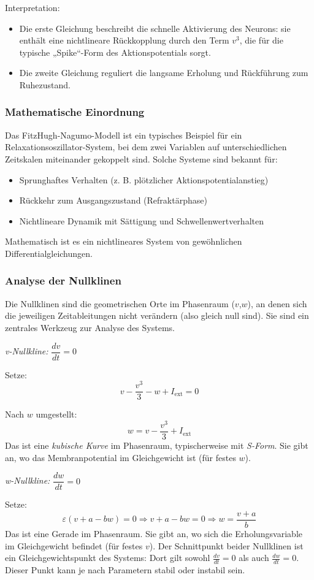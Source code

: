 \begin{refsection}
Interpretation:
\begin{itemize}
\item Die erste Gleichung beschreibt die schnelle Aktivierung des Neurons: sie enthält eine nichtlineare Rückkopplung durch den Term $v^3$, die für die typische „Spike“-Form des Aktionspotentials sorgt.
\item Die zweite Gleichung reguliert die langsame Erholung und Rückführung zum Ruhezustand.
\end{itemize}
\subsubsection{Mathematische Einordnung}
Das FitzHugh-Nagumo-Modell ist ein typisches Beispiel für ein Relaxationsoszillator-System, bei dem zwei Variablen auf unterschiedlichen Zeitskalen miteinander gekoppelt sind. Solche Systeme sind bekannt für:
\begin{itemize}
	\item Sprunghaftes Verhalten (z. B. plötzlicher Aktionspotentialanstieg)
	\item Rückkehr zum Ausgangszustand (Refraktärphase)
	\item Nichtlineare Dynamik mit Sättigung und Schwellenwertverhalten
\end{itemize}
Mathematisch ist es ein nichtlineares System von gewöhnlichen Differentialgleichungen.
\subsubsection{Analyse der Nullklinen}
Die Nullklinen sind die geometrischen Orte im Phasenraum ($v$,$w$), an denen sich die jeweiligen Zeitableitungen nicht verändern (also gleich null sind). Sie sind ein zentrales Werkzeug zur Analyse des Systems.

\emph{v-Nullkline:} $\dfrac{dv}{dt} = 0$

Setze:
\[
v - \frac{v^3}{3} - w + I_{\text{ext}} = 0
\]

Nach $w$ umgestellt:
\[
w = v - \frac{v^3}{3} + I_{\text{ext}}
\]
\noindent
Das ist eine \emph{kubische Kurve} im Phasenraum, typischerweise mit \emph{S-Form}.  
Sie gibt an, wo das Membranpotential im Gleichgewicht ist (für festes $w$).

\vspace{1em}

\emph{w-Nullkline:} $\dfrac{dw}{dt} = 0$

Setze:
\[
\varepsilon (v + a - b w) = 0 \Rightarrow v + a - b w = 0 \Rightarrow w = \frac{v + a}{b}
\]
\noindent
Das ist eine Gerade im Phasenraum.  
Sie gibt an, wo sich die Erholungsvariable im Gleichgewicht befindet (für festes $v$).
Der Schnittpunkt beider Nullklinen ist ein Gleichgewichtspunkt des Systems: Dort gilt sowohl $\frac{dv}{dt} = 0$ als auch $\frac{dw}{dt} = 0$. Dieser Punkt kann je nach Parametern stabil oder instabil sein.

\end{refsection}

